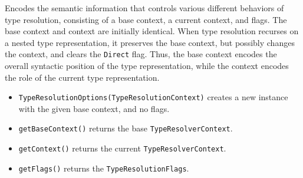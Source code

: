 \documentclass[../generics]{subfiles}
\begin{document}
Encodes the semantic information that controls various different behaviors of type resolution, consisting of a base context, a current context, and flags. The base context and context are initially identical. When type resolution recurses on a nested type representation, it preserves the base context, but possibly changes the context, and clears the \texttt{Direct} flag. Thus, the base context encodes the overall syntactic position of the type representation, while the context encodes the role of the current type representation.
\begin{itemize}
\item \texttt{TypeResolutionOptions(TypeResolutionContext)} creates a new instance with the given base context, and no flags.
\item \texttt{getBaseContext()} returns the base \texttt{TypeResolverContext}.
\item \texttt{getContext()} returns the current \texttt{TypeResolverContext}.
\item \texttt{getFlags()} returns the \texttt{TypeResolutionFlags}.
\end{itemize}
\end{document}
